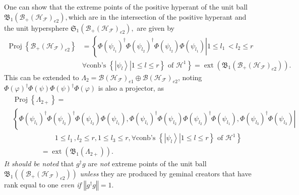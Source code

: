 \documentclass[aps,preprint]{revtex4}%
\begin{document}
One can show \cite{Kadison} that the extreme points of the positive hyperant
of the unit ball $\mathfrak{B}_{1}\left(  \mathcal{B}_{+}\left(
\mathcal{H}_{\mathcal{F}}\right)  _{e2}\right)  ,$which are in the
intersection of the positive hyperant and the unit hypersphere $\mathfrak{S}%
_{1}\left(  \mathcal{B}_{+}\left(  \mathcal{H}_{\mathcal{F}}\right)
_{e2}\right)  ,$ are given by
\begin{align}
\operatorname*{Proj}\left\{  \mathcal{B}_{+}\left(  \mathcal{H}_{\mathcal{F}%
}\right)  _{e2}\right\}   &  =\left\{  \left.  \Phi\left(  \psi_{l_{1}%
}\right)  ^{\dagger}\Phi\left(  \psi_{l_{2}}\right)  ^{\dagger}\Phi\left(
\psi_{l_{2}}\right)  \Phi\left(  \psi_{l_{1}}\right)  \right\vert \right.
1\leq l_{1}\,<l_{2}\leq r\nonumber\\
&  \left.  \forall\text{conb's }\left\{  \left.  \left\vert \psi
_{l}\right\rangle \right\vert 1\leq l\leq r\right\}  \text{ of }%
\mathcal{H}^{1}\right\}  =\operatorname*{ext}\left(  \mathfrak{B}_{1}\left(
\mathcal{B}_{+}\left(  \mathcal{H}_{\mathcal{F}}\right)  _{e2}\right)
\right)  .
\end{align}
This can be extended to $\Lambda_{2}=\mathcal{B}\left(  \mathcal{H}%
_{\mathcal{F}}\right)  _{e1}\oplus\mathcal{B}\left(  \mathcal{H}_{\mathcal{F}%
}\right)  _{e2}$, noting $\Phi\left(  \varphi\right)  ^{\dagger}\Phi\left(
\psi\right)  \Phi\left(  \psi\right)  ^{\dagger}\Phi\left(  \varphi\right)  $
is also a projector, as
\begin{align}
&  \operatorname*{Proj}\left\{  \Lambda_{2+}\right\}  =\nonumber\\
&  \left\{  \left.  \Phi\left(  \psi_{l_{1}}\right)  ^{\dagger}\Phi\left(
\psi_{l_{2}}\right)  ^{\dagger}\Phi\left(  \psi_{l_{2}}\right)  \Phi\left(
\psi_{l_{1}}\right)  ,\Phi\left(  \psi_{l_{1}}\right)  ^{\dagger}\Phi\left(
\psi_{l_{2}}\right)  \Phi\left(  \psi_{l_{2}}\right)  ^{\dagger}\Phi\left(
\psi_{l_{1}}\right)  ,\Phi\left(  \psi_{l_{3}}\right)  ^{\dagger}\Phi\left(
\psi_{l_{3}}\right)  \right\vert \right. \nonumber\\
&  \left.  \qquad\qquad\qquad\right.  1\leq l_{1}\,,l_{2}\leq r,1\leq
l_{3}\leq r,\left.  \forall\text{conb's }\left\{  \left.  \left\vert \psi
_{l}\right\rangle \right\vert 1\leq l\leq r\right\}  \text{ of }%
\mathcal{H}^{1}\right\} \nonumber\\
&  \left.  \qquad\qquad=\right.  \operatorname*{ext}\left(  \mathfrak{B}%
_{1}\left(  \Lambda_{2+}\right)  \right)  .
\end{align}
\emph{It should be noted} that $g^{\dagger}g$ are \emph{not }extreme points of
the unit ball $\mathfrak{B}_{1}\left(  \left(  \mathcal{B}_{+}\left(
\mathcal{H}_{\mathcal{F}}\right)  _{e2}\right)  \right)  $ \emph{unless }they
are produced by geminal creators that have rank equal to one \emph{even if
}$\left\Vert g^{\dagger}g\right\Vert =1$.
\end{document}
